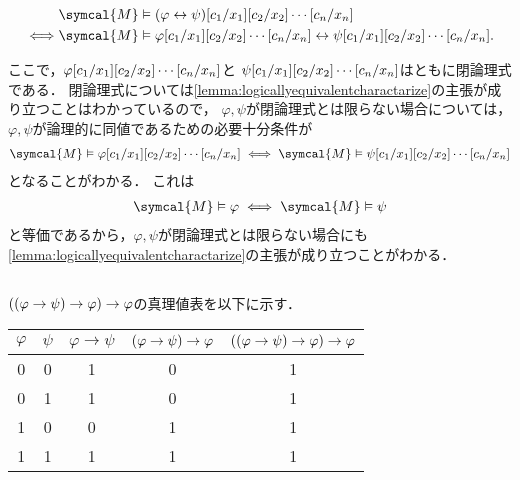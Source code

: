 \begin{align*}
	                & \symcal{M} \satisfy \subst{\subst{\subst{\paren{\varphi \formulaequiv \psi}}{c_1/x_1}}{c_2/x_2} \dotsb}{c_n/x_n}                                                    \\
	\metaequivalent & \symcal{M} \satisfy \subst{\subst{\subst{\varphi}{c_1/x_1}}{c_2/x_2} \dotsb}{c_n/x_n} \formulaequiv \subst{\subst{\subst{\psi}{c_1/x_1}}{c_2/x_2} \dotsb}{c_n/x_n}.
\end{align*}

ここで，\(\subst{\subst{\subst{\varphi}{c_1/x_1}}{c_2/x_2} \dotsb}{c_n/x_n}\)と
\(\subst{\subst{\subst{\psi}{c_1/x_1}}{c_2/x_2} \dotsb}{c_n/x_n}\)はともに閉論理式である．
閉論理式については\cref{lemma:logicallyequivalentcharactarize}の主張が成り立つことはわかっているので，
\(\varphi, \psi\)が閉論理式とは限らない場合については，\(\varphi, \psi\)が論理的に同値であるための必要十分条件が
\begin{align*}
	\symcal{M} \satisfy \subst{\subst{\subst{\varphi}{c_1/x_1}}{c_2/x_2} \dotsb}{c_n/x_n} \metaequivalent \symcal{M} \satisfy \subst{\subst{\subst{\psi}{c_1/x_1}}{c_2/x_2} \dotsb}{c_n/x_n}
\end{align*}
となることがわかる．
これは
\begin{align*}
	\symcal{M} \satisfy \varphi \metaequivalent \symcal{M} \satisfy \psi
\end{align*}
と等価であるから，\(\varphi, \psi\)が閉論理式とは限らない場合にも\cref{lemma:logicallyequivalentcharactarize}の主張が成り立つことがわかる．

\subsection*{}

\(\paren{\paren{\varphi \to \psi} \to \varphi} \to \varphi\)の真理値表を以下に示す．

\begin{table}[htbp]
	\centering
	\begin{tabular}{cc|ccc}
		\hline
		\(\varphi\) & \(\psi\) & \(\varphi \to \psi\) & \(\paren{\varphi \to \psi} \to \varphi\) & \(\paren{\paren{\varphi \to \psi} \to \varphi} \to \varphi\) \\ \hline
		0           & 0        & 1                    & 0                                        & 1                                                            \\
		0           & 1        & 1                    & 0                                        & 1                                                            \\
		1           & 0        & 0                    & 1                                        & 1                                                            \\
		1           & 1        & 1                    & 1                                        & 1                                                            \\
		\hline
	\end{tabular}
\end{table}

